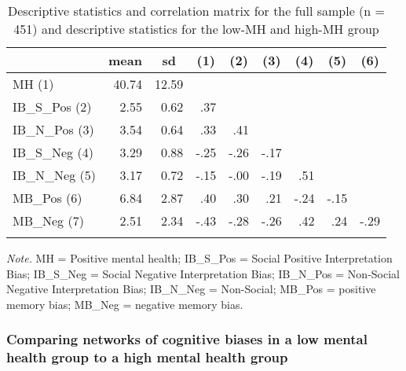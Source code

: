 \documentclass[
  english,
  man,floatsintext]{apa6}
\begin{document}
\begin{table}[tbp]

\begin{center}
\begin{threeparttable}

\caption{\label{tab:table1}Descriptive statistics and correlation matrix for the full sample (n = 451) and descriptive statistics for the low-MH and high-MH group}

\begin{tabular}{lrrrrrrrr}
\toprule
 & \multicolumn{1}{c}{mean} & \multicolumn{1}{c}{sd} & \multicolumn{1}{c}{(1)} & \multicolumn{1}{c}{(2)} & \multicolumn{1}{c}{(3)} & \multicolumn{1}{c}{(4)} & \multicolumn{1}{c}{(5)} & \multicolumn{1}{c}{(6)}\\
\midrule
MH (1) & 40.74 & 12.59 &  &  &  &  &  & \\
IB\_S\_Pos (2) & 2.55 & 0.62 & .37 &  &  &  &  & \\
IB\_N\_Pos (3) & 3.54 & 0.64 & .33 & .41 &  &  &  & \\
IB\_S\_Neg (4) & 3.29 & 0.88 & -.25 & -.26 & -.17 &  &  & \\
IB\_N\_Neg (5) & 3.17 & 0.72 & -.15 & -.00 & -.19 & .51 &  & \\
MB\_Pos (6) & 6.84 & 2.87 & .40 & .30 & .21 & -.24 & -.15 & \\
MB\_Neg (7) & 2.51 & 2.34 & -.43 & -.28 & -.26 & .42 & .24 & -.29\\
\bottomrule
\addlinespace
\end{tabular}

\begin{tablenotes}[para]
\normalsize{\textit{Note.} MH = Positive mental health; IB\_S\_Pos = Social Positive Interpretation Bias; IB\_S\_Neg = Social Negative Interpretation Bias; IB\_N\_Pos = Non-Social Negative Interpretation Bias; IB\_N\_Neg = Non-Social; MB\_Pos = positive memory bias; MB\_Neg = negative memory bias.}
\end{tablenotes}

\end{threeparttable}
\end{center}

\end{table}

\hypertarget{comparing-networks-of-cognitive-biases-in-a-low-mental-health-group-to-a-high-mental-health-group}{%
\subsubsection{Comparing networks of cognitive biases in a low mental health group to a high mental health group}\label{comparing-networks-of-cognitive-biases-in-a-low-mental-health-group-to-a-high-mental-health-group}}
\end{document}
